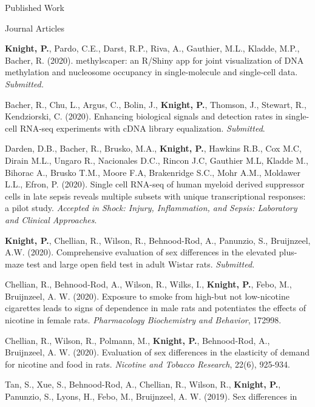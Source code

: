 \documentclass{resume}
\begin{document}
\begin{rSection}{Published Work} %
  \begin{rSubsection}{Journal Articles}{}{}{}
    \item \textbf{Knight, P.}, Pardo, C.E., Darst, R.P., Riva, A.,
      Gauthier, M.L., Kladde, M.P., Bacher, R. (2020). methylscaper:
      an R/Shiny app for joint visualization of DNA methylation and
      nucleosome occupancy in single-molecule and single-cell
      data. \textit{Submitted.}
    \item Bacher, R., Chu, L., Argus, C., Bolin, J., \textbf{Knight,
        P.}, Thomson, J., Stewart, R., Kendziorski,
      C. (2020). Enhancing biological signals and detection rates in
      single-cell RNA-seq experiments with cDNA library
      equalization. \textit{Submitted}.
    \item Darden, D.B., Bacher, R., Brusko, M.A., \textbf{Knight, P.}, Hawkins R.B., Cox M.C, Dirain M.L., Ungaro R., Nacionales D.C., Rincon J.C, Gauthier M.L, Kladde M., Bihorac A., Brusko T.M., Moore F.A, Brakenridge S.C., Mohr A.M., Moldawer L.L.,  Efron, P. (2020). Single cell RNA-seq of human myeloid derived suppressor
      cells in late sepsis reveals multiple subsets with unique
      transcriptional responses: a pilot study. \textit{Accepted in
        Shock: Injury, Inflammation, and Sepsis: Laboratory and
        Clinical Approaches}. 
    \item \textbf{Knight, P.}, Chellian, R., Wilson, R., Behnood-Rod,
      A., Panunzio, S., Bruijnzeel, A.W. (2020). Comprehensive evaluation of sex differences in the elevated
      plus-maze test and large open field test in adult Wistar
      rats. \textit{Submitted.}
    \item Chellian, R., Behnood-Rod, A., Wilson, R., Wilks, I.,
      \textbf{Knight, P.}, Febo, M., Bruijnzeel, A. W. (2020). Exposure to
      smoke from high-but not low-nicotine cigarettes leads to signs
      of dependence in male rats and potentiates the effects of
      nicotine in female rats. \textit{Pharmacology Biochemistry and Behavior},
      172998.
    \item Chellian, R., Wilson, R., Polmann, M., \textbf{Knight, P.},
      Behnood-Rod, A., Bruijnzeel, A. W. (2020). Evaluation of sex
      differences in the elasticity of demand for nicotine and food in
      rats. \textit{Nicotine and Tobacco Research}, 22(6), 925-934.
    \item Tan, S., Xue, S., Behnood-Rod, A., Chellian, R., Wilson, R.,
      \textbf{Knight, P.}, Panunzio, S., Lyons, H., Febo, M., Bruijnzeel, A. W. (2019). Sex differences in

\end{rSubsection}
\end{rSection}
\end{document}
